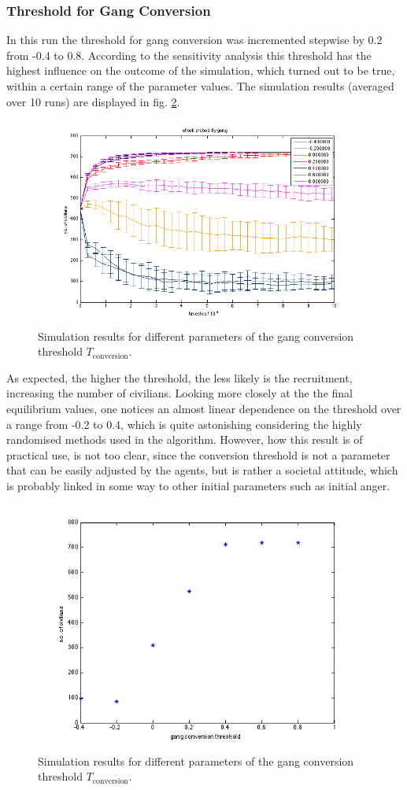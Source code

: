\documentclass[11pt]{article}
\begin{document}
\subsubsection{Threshold for Gang Conversion}
In this run the threshold for gang conversion was incremented stepwise by 0.2 from -0.4 to 0.8. According to the sensitivity analysis this threshold has the highest influence on the outcome of the simulation, which turned out to be true, within a certain range of the parameter values. The simulation results (averaged over 10 runs) are displayed in fig. \ref{gangconv}. 
\begin{figure}[h!]
	\centering
	\includegraphics[width=11cm]{gangconv.png}
	\caption{Simulation results for different parameters of the gang conversion threshold $T_{\text{conversion}}$. }\label{gangconv}
\end{figure}
\newpage

As expected, the higher the threshold, the less likely is the recruitment, increasing the number of civilians. Looking more closely at the the final equilibrium values, one notices an almost linear dependence on the threshold over a range from -0.2 to 0.4, which is quite astonishing considering the highly randomised methods used in the algorithm. However, how this result is of practical use, is not too clear, since the conversion threshold is not a parameter that can be easily adjusted by the agents, but is rather a societal attitude, which is probably linked in some way to other initial parameters such as initial anger. 
\begin{figure}[h!]
	\centering
	\includegraphics[width=11cm]{gangconv2.png}
	\caption{Simulation results for different parameters of the gang conversion threshold $T_{\text{conversion}}$. }\label{gangconv}
\end{figure}
\newpage
\end{document}
